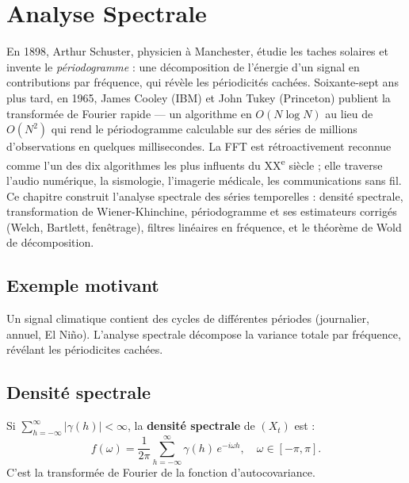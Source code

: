 \chapter{Analyse Spectrale}
\label{ch:spectrale}

En 1898, Arthur Schuster, physicien à Manchester, étudie les taches solaires et invente le \emph{périodogramme} : une décomposition de l'énergie d'un signal en contributions par fréquence, qui révèle les périodicités cachées. Soixante-sept ans plus tard, en 1965, James Cooley (IBM) et John Tukey (Princeton) publient la transformée de Fourier rapide --- un algorithme en $O(N\log N)$ au lieu de $O(N^2)$ qui rend le périodogramme calculable sur des séries de millions d'observations en quelques millisecondes. La FFT est rétroactivement reconnue comme l'un des dix algorithmes les plus influents du XX\textsuperscript{e} siècle ; elle traverse l'audio numérique, la sismologie, l'imagerie médicale, les communications sans fil. Ce chapitre construit l'analyse spectrale des séries temporelles : densité spectrale, transformation de Wiener-Khinchine, périodogramme et ses estimateurs corrigés (Welch, Bartlett, fenêtrage), filtres linéaires en fréquence, et le théorème de Wold de décomposition.

\section{Exemple motivant}
Un signal climatique contient des cycles de diff\'erentes p\'eriodes (journalier, annuel, El Ni\~no). L'analyse spectrale d\'ecompose la variance totale par fr\'equence, r\'ev\'elant les p\'eriodicites cach\'ees.

\section{Densit\'e spectrale}

\begin{definition}
Si $\sum_{h=-\infty}^{\infty}|\gamma(h)|<\infty$, la \textbf{densit\'e spectrale} de $(X_t)$ est :
\[
f(\omega) = \frac{1}{2\pi}\sum_{h=-\infty}^{\infty}\gamma(h)\,e^{-i\omega h}, \quad \omega\in[-\pi,\pi].
\]
C'est la transform\'ee de Fourier de la fonction d'autocovariance.
\end{definition}

